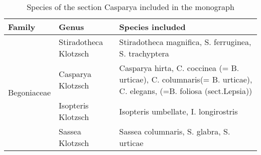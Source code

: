\begin{table}[htbp]
  \centering
  \caption{Species of the section Casparya included in the monograph }
    \begin{tabular}{cll}
    \toprule
    \multicolumn{1}{l}{Family} & Genus & Species included \\
    \midrule
    \multirow{4}[8]{*}{Begoniaceae} & Stiradotheca Klotzsch & Stiradotheca magnifica, S. ferruginea, S. trachyptera \\
\cmidrule{2-3}          & Casparya Klotzsch & \multicolumn{1}{p{37.355em}}{Casparya hirta, C. coccinea (= B. urticae), C. columnaris\newline{}(= B. urticae), C. elegans, (=B. foliosa (sect.\newline{}Lepsia))} \\
\cmidrule{2-3}          & Isopteris Klotzsch & Isopteris umbellate, I. longirostris \\
\cmidrule{2-3}          & Sassea Klotzsch & Sassea columnaris, S. glabra, S. urticae \\
    \bottomrule
    \bottomrule
    \end{tabular}%
  \label{tab:addlabel}%
\end{table}%
